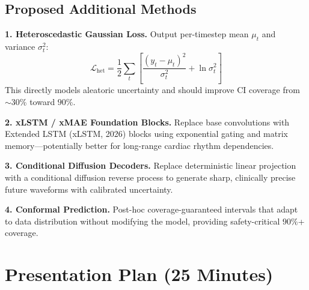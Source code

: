 \documentclass[10pt,journal,compsoc]{IEEEtran}
\begin{document}
\subsection{Proposed Additional Methods}

\textbf{1. Heteroscedastic Gaussian Loss.} Output per-timestep mean $\mu_t$ and variance $\sigma_t^2$:
\begin{equation}
    \mathcal{L}_{\text{het}} = \frac{1}{2}\sum_t \left[\frac{(y_t - \mu_t)^2}{\sigma_t^2} + \ln \sigma_t^2\right]
\end{equation}
This directly models aleatoric uncertainty and should improve CI coverage from $\sim$30\% toward $90\%$.

\textbf{2. xLSTM / xMAE Foundation Blocks.} Replace base convolutions with Extended LSTM (xLSTM, 2026) blocks using exponential gating and matrix memory---potentially better for long-range cardiac rhythm dependencies.

\textbf{3. Conditional Diffusion Decoders.} Replace deterministic linear projection with a conditional diffusion reverse process to generate sharp, clinically precise future waveforms with calibrated uncertainty.

\textbf{4. Conformal Prediction.} Post-hoc coverage-guaranteed intervals that adapt to data distribution without modifying the model, providing safety-critical $90\%$+ coverage.

\section{Presentation Plan (25 Minutes)}
\label{sec:presentation}
\end{document}
